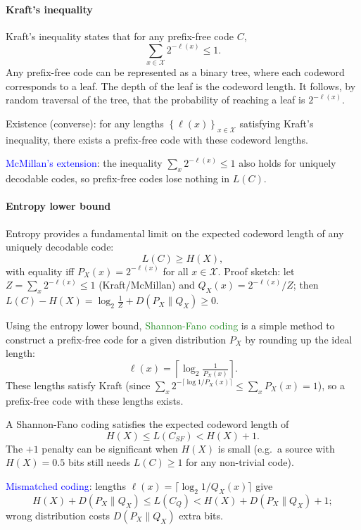\paragraph{Kraft's inequality}
{Kraft's inequality} states that for any prefix-free code $C$,
\[\sum_{x\in \mathcal{X}} 2^{-\ell(x)}\le 1.\]
Any prefix-free code can be \textcolor{Bittersweet}{represented as a
binary tree}, where each codeword corresponds to a leaf. The depth of
the leaf is the codeword length. It follows, by random traversal of the tree,
that the \textcolor{Bittersweet}{probability of reaching a leaf is
$2^{-\ell(x)}$}.

\textcolor{Bittersweet}{Existence (converse)}: for any lengths
$\left\{\ell(x)\right\}_{x\in \mathcal{X}}$ satisfying Kraft's inequality,
there exists a prefix-free code with these codeword lengths.

\textcolor{Blue}{McMillan's extension}: the inequality $\sum_x 2^{-\ell(x)}\le 1$ also holds for uniquely decodable codes, so \textcolor{Bittersweet}{prefix-free codes lose nothing in $L(C)$}.

\paragraph{Entropy lower bound}
Entropy provides a fundamental \textcolor{Bittersweet}{limit on the expected
codeword length} of any uniquely decodable code:
\[L(C)\ge H(X),\]
with equality iff ${P_X(x)}=2^{-\ell(x)}$ for all $x\in \mathcal{X}$.
\textcolor{Bittersweet}{Proof sketch}: let $Z=\sum_x 2^{-\ell(x)}\le 1$ (Kraft/McMillan) and $Q_X(x)=2^{-\ell(x)}/Z$; then $L(C)-H(X)=\log_2\tfrac{1}{Z}+D(P_X\|Q_X)\ge 0$.

Using the entropy lower bound, \textcolor{ForestGreen}{Shannon-Fano
coding} is a simple method to construct a \textcolor{Bittersweet}{prefix-free
code for a given distribution} $P_X$ by rounding up the ideal length:
\[\ell(x)=\left\lceil \log_2\tfrac{1}{P_X(x)} \right\rceil.\]
These lengths satisfy Kraft (since $\sum_x 2^{-\lceil\log 1/P_X(x)\rceil}\le
\sum_x P_X(x)=1$), so a prefix-free code with these lengths exists.

A Shannon-Fano coding satisfies the \textcolor{Bittersweet}{expected codeword
length} of
\[H(X)\le L(C_{SF})< H(X)+1.\]
The $+1$ penalty can be significant when $H(X)$ is small (e.g.\ a source with
$H(X)=0.5$ bits still needs $L(C)\ge 1$ for any non-trivial code).

\textcolor{Blue}{Mismatched coding}: lengths $\ell(x)=\lceil\log_2 1/Q_X(x)\rceil$ give
\[H(X)+D(P_X\|Q_X)\le L(C_Q)< H(X)+D(P_X\|Q_X)+1;\]
\textcolor{Bittersweet}{wrong distribution costs $D(P_X\|Q_X)$ extra bits}.

